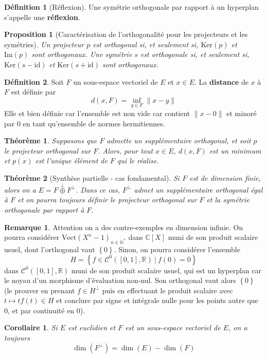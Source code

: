\documentclass[french]{article}
\newcommand{\N}{\mathbb{N}}
\newcommand{\R}{\mathbb{R}}
\newcommand{\C}{\mathbb{C}}
\newcommand{\st}{^*}
\renewcommand{\ker}{\text{Ker}}
\newcommand{\im}{\text{Im}}
\newcommand{\id}{\text{id}}
\newcommand{\vect}{\text{Vect}}
\theoremstyle{plain}
\newtheorem{thm}{Théorème}
\newtheorem{prop}{Proposition}
\newtheorem{cor}{Corollaire}
\theoremstyle{definition}
\newtheorem{dfn}{Définition}
\newtheorem{rmq}{Remarque}
\begin{document}
\begin{dfn}[Réflexion]
	Une symétrie orthogonale par rapport à un hyperplan s'appelle une \textbf{réflexion}.
\end{dfn}
\begin{prop}[Caractérisation de l'orthogonalité pour les projecteurs et les symétries]
	Un projecteur $p$ est orthogonal si, et seulement si, $\ker(p)$ et $\im(p)$ sont orthogonaux. Une symétrie $s$ est orthogonale si, et seulement si, $\ker(s-\id)$ et $\ker(s+\id)$ sont orthogonaux.
\end{prop}
\begin{dfn}
	Soit $F$ un sous-espace vectoriel de $E$ et $x\in E$. La \textbf{distance} de $x$ à $F$ est définie par $$d(x,F)=\underset{y\in F}{\inf}\lVert x-y\rVert$$ Elle et bien définie car l'ensemble est non vide car contient $\lVert x-0\rVert$ et minoré par $0$ en tant qu'ensemble de normes hermitiennes.
\end{dfn}
\begin{thm}
	Supposons que $F$ admette un supplémentaire orthogonal, et soit $p$ le projecteur orthogonal sur $F$. Alors, pour tout $x\in E$, $d(x,F)$ est un minimum et $p(x)$ est l'unique élément de $F$ qui le réalise.
\end{thm}
\begin{thm}[Synthèse partielle - cas fondamental]
	Si $F$ est de dimension finie, alors on a $E=F\overset{\perp}{\oplus}F^\perp$. Dans ce cas, $F^\perp$ admet un supplémentaire orthogonal égal à $F$ et on pourra toujours définir le projecteur orthogonal sur $F$ et la symétrie orthogonale par rapport à $F$.
\end{thm}
\begin{rmq} Attention on a des contre-exemples en dimension infinie. On pourra considérer $\vect(X^n-1)_{n\in\N\st}$ dans $\C[X]$ muni de son produit scalaire usuel, dont l'orthogonal vaut $\left\{0\right\}$. Sinon, on pourra considérer l'ensemble $$H=\left\{f\in\mathcal{C}^0([0,1],\R) \ | \ f(0)=0\right\}$$ dans $\mathcal{C}^0([0,1],\R)$ muni de son produit scalaire usuel, qui est un hyperplan car le noyau d'un morphisme d'évaluation non-nul. Son orthogonal vaut alors $\left\{0\right\}$ (le prouver en prenant $f\in H^\perp$ puis en effectuant le produit scalaire avec $t\mapsto tf(t) \in H$ et conclure par signe et intégrale nulle pour les points autre que 0, et par continuité en 0). \end{rmq}
\begin{cor}
	Si $E$ est euclidien et $F$ est un sous-espace vectoriel de $E$, on a toujours $$\dim(F^\perp)=\dim(E)-\dim(F)$$
\end{cor}
\end{document}

